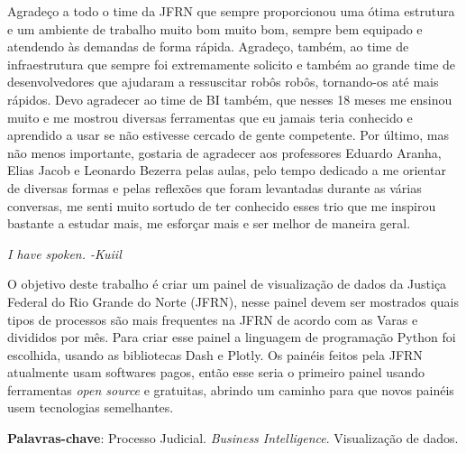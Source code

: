 \documentclass[
    12pt,				%
	oneside,            %
	a4paper,			%
	english,			%
	french,
	spanish,
	brazil				%
	]{abntex2}
\begin{document}
\begin{agradecimentos}
Agradeço a todo o time da JFRN que sempre proporcionou uma ótima estrutura e um ambiente de trabalho muito bom muito bom, sempre bem equipado e atendendo às demandas de forma rápida. Agradeço, também, ao time de infraestrutura que sempre foi extremamente solicito e também ao grande time de desenvolvedores que ajudaram a ressuscitar robôs robôs, tornando-os até mais rápidos. Devo agradecer ao time de BI também, que nesses 18 meses me ensinou muito e me mostrou diversas ferramentas que eu jamais teria conhecido e aprendido a usar se não estivesse cercado de gente competente. Por último, mas não menos importante, gostaria de agradecer aos professores Eduardo Aranha, Elias Jacob e Leonardo Bezerra pelas aulas, pelo tempo dedicado a me orientar de diversas formas e pelas reflexões que foram levantadas durante as várias conversas, me senti muito sortudo de ter conhecido esses trio que me inspirou bastante a estudar mais, me esforçar mais e ser melhor de maneira geral.
\end{agradecimentos}

\begin{epigrafe}
    \vspace*{\fill}
	\begin{flushright}
		\textit{I have spoken. -Kuiil}
	\end{flushright}
\end{epigrafe}

\setlength{\absparsep}{18pt} %
\begin{resumo}
\vspace{\onelineskip}

O objetivo deste trabalho é criar um painel de visualização de dados da Justiça Federal do Rio Grande do Norte (JFRN), nesse painel devem ser mostrados quais tipos de processos são mais frequentes na JFRN de acordo com as Varas e divididos por mês. Para criar esse painel a linguagem de programação Python foi escolhida, usando as bibliotecas Dash e Plotly. Os painéis feitos pela JFRN atualmente usam softwares pagos, então esse seria o primeiro painel usando ferramentas \textit{open source} e gratuitas, abrindo um caminho para que novos painéis usem tecnologias semelhantes.

\noindent\textbf{Palavras-chave}: Processo Judicial. \textit{Business Intelligence}. Visualização de dados.
\end{resumo}
\end{document}
